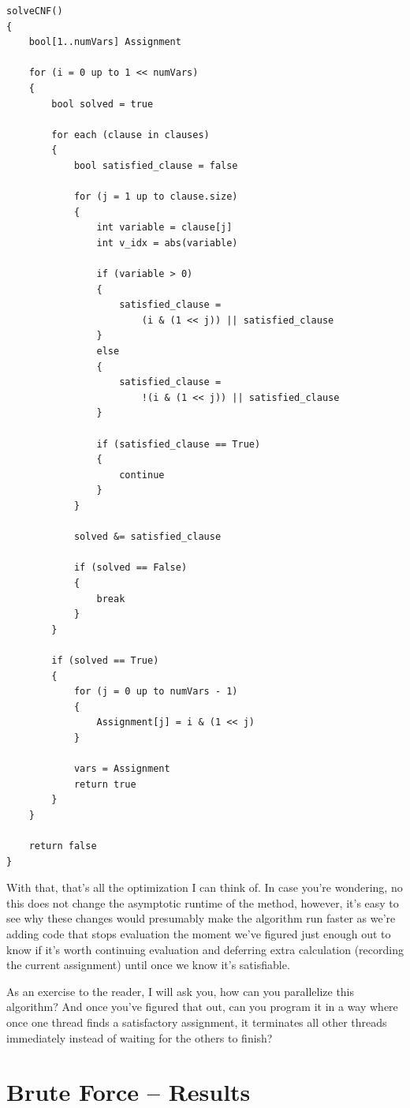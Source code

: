 \begin{lstlisting}
solveCNF()
{
    bool[1..numVars] Assignment

    for (i = 0 up to 1 << numVars)
    {
        bool solved = true

        for each (clause in clauses)
        {
            bool satisfied_clause = false

            for (j = 1 up to clause.size)
            {
                int variable = clause[j]
                int v_idx = abs(variable)

                if (variable > 0)
                {
                    satisfied_clause =
                        (i & (1 << j)) || satisfied_clause
                }
                else
                {
                    satisfied_clause =
                        !(i & (1 << j)) || satisfied_clause
                }

                if (satisfied_clause == True)
                {
                    continue
                }
            }

            solved &= satisfied_clause

            if (solved == False)
            {
                break
            }
        }

        if (solved == True)
        {
            for (j = 0 up to numVars - 1)
            {
                Assignment[j] = i & (1 << j)
            }

            vars = Assignment
            return true
        }
    }

    return false
}
\end{lstlisting}

With that, that's all the optimization I can think of. In case you're
wondering, no this does not change the asymptotic runtime of the method,
however, it's easy to see why these changes would presumably make the
algorithm run faster as we're adding code that stops evaluation the moment
we've figured just enough out to know if it's worth continuing evaluation and
deferring extra calculation (recording the current assignment) until once we
know it's satisfiable.

As an exercise to the reader, I will ask you, how can you parallelize this
algorithm? And once you've figured that out, can you program it in a way
where once one thread finds a satisfactory assignment, it terminates all other
threads immediately instead of waiting for the others to finish?

\section{Brute Force -- Results}

